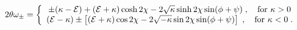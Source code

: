 \begin{equation}
 {2\theta\omega_\pm}=\left\{
 \begin{array}{c}
  \pm(\kappa-{\cal E})+({\cal E}+
\kappa)\cosh 2\chi-2\sqrt{\kappa}\sinh 2\chi
\sin(\phi+\psi) \; ,\quad \mbox{for }
  \kappa>0\\
  ({\cal E}-\kappa)\pm\left[
  ({\cal E}+\kappa)\cos 2\chi
 -2\sqrt{-\kappa}\sin 2\chi \sin(\phi+\psi)\right]\; ,
\quad \mbox{for }  \kappa<0 \; .
 \end{array}\right.
\label{250}\end{equation}

